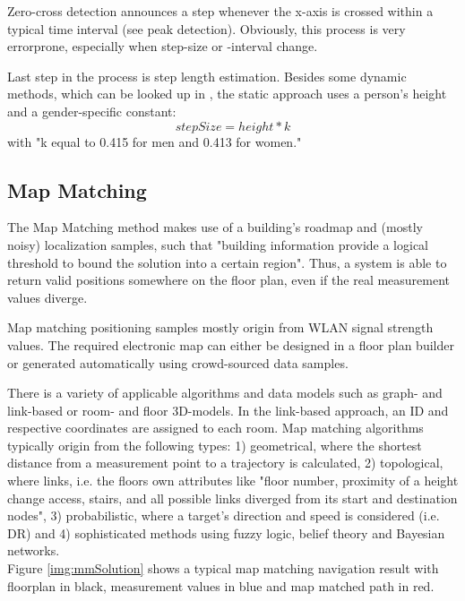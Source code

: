 Zero-cross detection announces a step whenever the x-axis is crossed within a typical time interval (see peak detection). Obviously, this process is very errorprone, especially when step-size or -interval change.

Last step in the process is step length estimation. Besides some dynamic methods, which can be looked up in \cite{drSystem}, the static approach uses a person's height and a gender-specific constant: \[stepSize = height * k\] with "k equal to 0.415 for men and 0.413 for women." \cite{drSystem}

\subsection*{Map Matching}

The Map Matching method makes use of a building's roadmap and (mostly noisy) localization samples, such that "building information provide a logical threshold to bound the solution into a certain region"\cite{mmSystem}. Thus, a system is able to return valid positions somewhere on the floor plan, even if the real measurement values diverge.

Map matching positioning samples mostly origin from WLAN signal strength values.
The required electronic map can either be designed in a floor plan builder or generated automatically using crowd-sourced data samples. 

There is a variety of applicable algorithms and data models such as graph- and link-based or room- and floor 3D-models. In the link-based approach, an ID and respective coordinates are assigned to each room. 
Map matching algorithms typically origin from the following types: 
1) geometrical, where the shortest distance from a measurement point to a trajectory is calculated, 2) topological, where links, i.e. the floors own attributes like "floor number, proximity of a height change access, stairs, and all possible links diverged from its start and destination nodes"\cite{mmSystem}, 3) probabilistic, where a target's direction and speed is considered (i.e. DR) and 4) sophisticated methods using fuzzy logic, belief theory and Bayesian networks. \\
Figure \ref{img:mmSolution}	shows a typical map matching navigation result with floorplan in black, measurement values in blue and map matched path in red.


